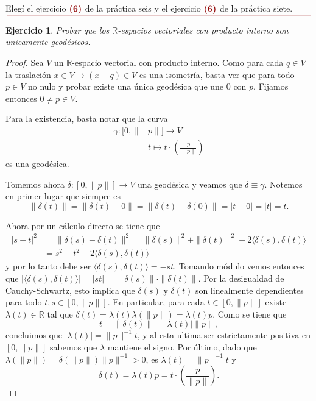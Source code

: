 \documentclass[11pt]{article}
\title{
\LARGE{\paint{Topolog\'ia Algebraica}}
\\
\vspace{5pt}
\small{\paint{Ejercicios para Entregar - Pr\'acticas 6 y 7}}
\\
\vspace{5pt}
\large{\paint{Guido Arnone}}
\\
\paint{
\rule{250pt}{0.5pt}
}
}
\author{}
\date{}
\theoremstyle{colored}
\newtheorem{exercise}{Ejercicio}
\newcommand{\R}{\mathbb{R}}
\newcommand{\paint}[1]{\color{color}{#1}}
\newcommand{\tpaint}[1]{\paint{\textbf{#1}}}
\begin{document}
\maketitle

\begin{center}
\paint{\large{Sobre los Ejercicios}}\\
\end{center}

\begin{center}
Elegí el ejercicio $\tpaint{(6)}$ de la práctica seis y el ejercicio $\tpaint{(6)}$ de la práctica siete.
$\paint{
\rule{400pt}{0.5pt}
}$
\vspace{35pt}
\end{center}

\setcounter{exercise}{5}
\begin{exercise} Probar que los $\R$-espacios vectoriales con producto interno son unicamente geodésicos.
\end{exercise}
\begin{proof} Sea $V$ un $\R$-espacio vectorial con producto interno. Como para cada $q \in V$ la traslación $x \in V \mapsto (x - q) \in V$ es una isometría, basta ver que para todo $p \in V$ no nulo y probar existe una única geodésica que une $0$ con $p$. Fijamos entonces $0 \neq p \in V$. 

Para la existencia, basta notar que la curva
\begin{align*}
\gamma : [0,\|&p\|] \longrightarrow V\\
& t \longmapsto t \cdot \left(\frac{p}{\|p\|}\right)
\end{align*}
es una geodésica. 

Tomemos ahora $\delta: [0,\|p\|] \to V$ una geodésica y veamos que $\delta \equiv \gamma$. Notemos en primer lugar que siempre es 
\[
\|\delta(t)\| = \|\delta(t)-0\| = \|\delta(t)-\delta(0)\| = |t-0| = |t| = t.
\]

Ahora por un cálculo directo se tiene que
\begin{align*}
|s-t|^2 &= \|\delta(s) - \delta(t)\|^2 = \|\delta(s)\|^2 + \|\delta(t)\|^2 + 2\langle \delta(s), \delta(t)\rangle\\
& = s^2 + t^2 + 2\langle \delta(s), \delta(t)\rangle
\end{align*}
y por lo tanto debe ser $\langle \delta(s), \delta(t)\rangle = -st$. Tomando módulo vemos entonces que $|\langle \delta(s), \delta(t)\rangle| = |st| = \|\delta(s)\|\cdot\|\delta(t)\|$. Por la desigualdad de Cauchy-Schwartz, esto implica que $\delta(s)$ y $\delta(t)$ son linealmente dependientes para todo $t,s \in [0,\|p\|]$. En particular, para cada $t \in [0,\|p\|]$ existe $\lambda(t) \in \R$ tal que $\delta(t) = \lambda(t)\lambda(\|p\|) = \lambda(t)p$. Como se tiene que
\[
t = \|\delta(t)\| = |\lambda(t)| \|p\|,
\]
concluimos que $|\lambda(t)| = \|p\|^{-1}t$, y al esta ultima ser estrictamente positiva en $[0,\|p\|]$ sabemos que $\lambda$ mantiene el signo. Por último, dado que $\lambda(\|p\|) = \delta(\|p\|)\|p\|^{-1} > 0$, es $\lambda(t) = \|p\|^{-1}t$ y 
\[
\delta(t) = \lambda(t)p = t \cdot \left(\frac{p}{\|p\|}\right).
\]
\end{proof}
\end{document}
